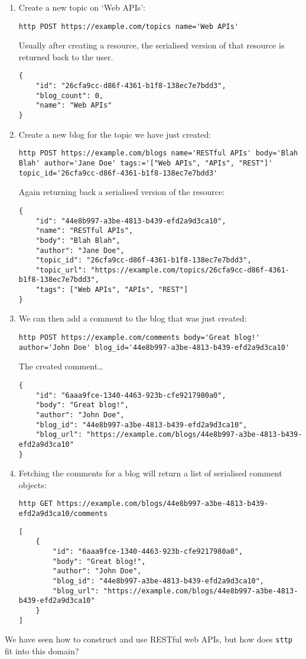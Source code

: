 \begin{enumerate}
    \item Create a new topic on `Web APIs':
    \begin{verbatim}
http POST https://example.com/topics name='Web APIs' 
    \end{verbatim}
    Usually after creating a resource, the serialised version of that resource is returned back to the user.
    \begin{verbatim}
{
    "id": "26cfa9cc-d86f-4361-b1f8-138ec7e7bdd3",
    "blog_count": 0,
    "name": "Web APIs"
}
    \end{verbatim}
    \item Create a new blog for the topic we have just created:
    \begin{verbatim}
http POST https://example.com/blogs name='RESTful APIs' body='Blah Blah' author='Jane Doe' tags:='["Web APIs", "APIs", "REST"]' topic_id='26cfa9cc-d86f-4361-b1f8-138ec7e7bdd3'
    \end{verbatim}
    Again returning back a serialised version of the resource:
    \begin{verbatim}
{
    "id": "44e8b997-a3be-4813-b439-efd2a9d3ca10",
    "name": "RESTful APIs",
    "body": "Blah Blah",
    "author": "Jane Doe",
    "topic_id": "26cfa9cc-d86f-4361-b1f8-138ec7e7bdd3",
    "topic_url": "https://example.com/topics/26cfa9cc-d86f-4361-b1f8-138ec7e7bdd3",
    "tags": ["Web APIs", "APIs", "REST"]
}
    \end{verbatim}
    \item We can then add a comment to the blog that was just created:
    \begin{verbatim}
http POST https://example.com/comments body='Great blog!' author='John Doe' blog_id='44e8b997-a3be-4813-b439-efd2a9d3ca10'
    \end{verbatim}
    The created comment\dots
    \begin{verbatim}
{
    "id": "6aaa9fce-1340-4463-923b-cfe9217980a0",
    "body": "Great blog!",
    "author": "John Doe",
    "blog_id": "44e8b997-a3be-4813-b439-efd2a9d3ca10",
    "blog_url": "https://example.com/blogs/44e8b997-a3be-4813-b439-efd2a9d3ca10"
}
    \end{verbatim}
    \item Fetching the comments for a blog will return a list of serialised comment objects:
    \begin{verbatim}
http GET https://example.com/blogs/44e8b997-a3be-4813-b439-efd2a9d3ca10/comments
    \end{verbatim}
    \begin{verbatim}
[
    {
        "id": "6aaa9fce-1340-4463-923b-cfe9217980a0",
        "body": "Great blog!",
        "author": "John Doe",
        "blog_id": "44e8b997-a3be-4813-b439-efd2a9d3ca10",
        "blog_url": "https://example.com/blogs/44e8b997-a3be-4813-b439-efd2a9d3ca10"
    }
]
    \end{verbatim}
\end{enumerate}

We have seen how to construct and use RESTful web APIs, but how does \verb|sttp| fit into this domain?
